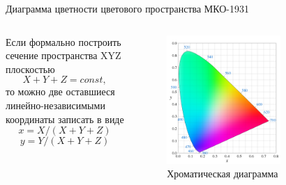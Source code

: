 \documentclass{beamer}
\begin{document}
	\begin{frame}{Диаграмма цветности цветового пространства МКО-1931}
		\begin{columns}
			\begin{column}{0.4\textwidth}
				Если формально построить сечение пространства XYZ плоскостью 
				\[X+Y+Z=const,\]
				то можно две оставшиеся линейно-независимыми координаты записать в виде				
				\[x=X/(X+Y+Z)\]
				\[y=Y/(X+Y+Z)\]
			\end{column}
			\begin{column}{0.6\textwidth}
				\begin{figure}
					\includegraphics[width=0.7\textwidth]{images/CIExy1931_fixed.png}
					\caption{ Хроматическая диаграмма}
				\end{figure}
			\end{column}
		\end{columns}



	\end{frame}
\end{document}
